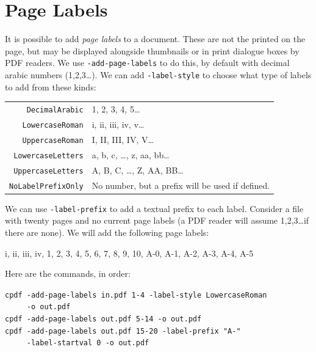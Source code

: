 \documentclass{book}
\begin{document}
\section{Page Labels}

It is possible to add \textit{page labels} to a document. These are not the printed on the page, but may be displayed alongside thumbnails or in print dialogue boxes by PDF readers. We use \texttt{-add-page-labels} to do this, by default with decimal arabic numbers (1,2,3\ldots). We can add \texttt{-label-style} to choose what type of labels to add from these kinds:

\vspace{4mm}
{\small\begin{tabular}{rl}
  \texttt{DecimalArabic} & 1, 2, 3, 4, 5\ldots \\
  \texttt{LowercaseRoman} & i, ii, iii, iv, v\ldots \\
  \texttt{UppercaseRoman} & I, II, III, IV, V\ldots \\
  \texttt{LowercaseLetters} & a, b, c, \ldots , z, aa, bb\ldots \\
  \texttt{UppercaseLetters} & A, B, C, \ldots , Z, AA, BB\ldots \\
  \texttt{NoLabelPrefixOnly} & No number, but a prefix will be used if defined.
\end{tabular}}
\vspace{4mm}

\noindent We can use \texttt{-label-prefix} to add a textual prefix to each label. 
Consider a file with twenty pages and no current page labels (a PDF reader will assume 1,2,3\ldots if there are none). We will add the following page labels:

\vspace{4mm}
i, ii, iii, iv, 1, 2, 3, 4, 5, 6, 7, 8, 9, 10, A-0, A-1, A-2, A-3, A-4, A-5
\vspace{4mm}

\noindent Here are the commands, in order:

{\small\begin{framed}
  \noindent\verb!cpdf -add-page-labels in.pdf 1-4 -label-style LowercaseRoman!\\
  \noindent\verb!     -o out.pdf!\\
  
  \noindent\verb!cpdf -add-page-labels out.pdf 5-14 -o out.pdf!\\

  \noindent\verb!cpdf -add-page-labels out.pdf 15-20 -label-prefix "A-"!\\
  \noindent\verb!     -label-startval 0 -o out.pdf!
\end{framed}}
\end{document}
